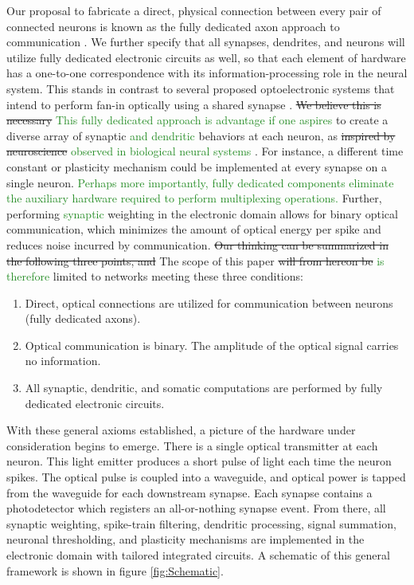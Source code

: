 \documentclass[twocolumn]{article}
\begin{document}
Our proposal to fabricate a direct, physical connection between every pair of connected neurons is known as the fully dedicated axon approach to communication \cite{seda2016}. We further specify that all synapses, dendrites, and neurons will utilize fully dedicated electronic circuits as well, so that each element of hardware has a one-to-one correspondence with its information-processing role in the neural system. This stands in contrast to several proposed optoelectronic systems that intend to perform fan-in optically using a shared synapse \cite{nazirzadeh2018energy}. \sout{We believe this is necessary} \textcolor{ForestGreen}{This fully dedicated approach is advantage if one aspires} to create a diverse array of synaptic \textcolor{ForestGreen}{and dendritic} behaviors at each neuron, as \sout{inspired by neuroscience} \textcolor{ForestGreen}{observed in biological neural systems \cite{refs}}. For instance, a different time constant or plasticity mechanism could be implemented at every synapse on a single neuron. \textcolor{ForestGreen}{Perhaps more importantly, fully dedicated components eliminate the auxiliary hardware required to perform multiplexing operations.} Further, performing \textcolor{ForestGreen}{synaptic} weighting in the electronic domain allows for binary optical communication, which minimizes the amount of optical energy per spike and reduces noise incurred by communication. \sout{Our thinking can be summarized in the following three points, and} The scope of this paper \sout{will from hereon be} \textcolor{ForestGreen}{is therefore} limited to networks meeting these three conditions:

\begin{enumerate}
    \item Direct, optical connections are utilized for communication between neurons (fully dedicated axons).
    \item Optical communication is binary. The amplitude of the optical signal carries no information.
    \item All synaptic, dendritic, and somatic computations are performed by fully dedicated electronic circuits.
\end{enumerate}

With these general axioms established, a picture of the hardware under consideration begins to emerge. There is a single optical transmitter at each neuron. This light emitter produces a short pulse of light each time the neuron spikes. The optical pulse is coupled into a waveguide, and optical power is tapped from the waveguide for each downstream synapse. Each synapse contains a photodetector which registers an all-or-nothing synapse event. From there, all synaptic weighting, spike-train filtering, dendritic processing, signal summation, neuronal thresholding, and plasticity mechanisms are implemented in the electronic domain with tailored integrated circuits. A schematic of this general framework is shown in figure \ref{fig:Schematic}.
\end{document}
